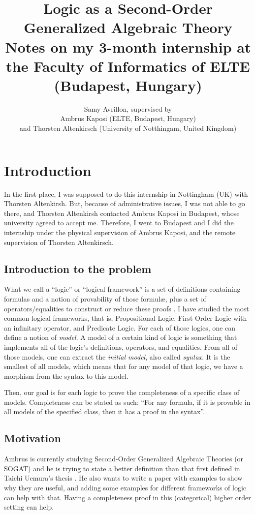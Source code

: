 \documentclass[10pt,a4paper]{article}
\title{Logic as a Second-Order Generalized Algebraic Theory
	\\[1ex] \large Notes on my 3-month internship at the Faculty of Informatics of ELTE (Budapest, Hungary)}
\author{Samy Avrillon, supervised by
	\\[1ex] Ambrus Kaposi (ELTE, Budapest, Hungary)
	\\[1ex] and Thorsten Altenkirsch (University of Notthingam, United Kingdom)}
\begin{document}
	\doparttoc
	\maketitle
	
	\hsep
	
	\tableofcontents
	
	\newpage
	
	
	\section{Introduction}
	
		In the first place, I was supposed to do this internship in Nottingham (UK) with Thorsten Altenkirsh. But, because of administrative issues, I was not able to go there, and Thorsten Altenkirsh contacted Ambrus Kaposi in Budapest, whose university agreed to accept me. Therefore, I went to Budapest and I did the internship under the physical supervision of Ambrus Kaposi, and the remote supervision of Thorsten Altenkirsch.
		
		\subsection{Introduction to the problem}
			What we call a \enquote{logic} or \enquote{logical framework} is a set of definitions containing formulas and a notion of provability of those formulæ, plus a set of operators/equalities to construct or reduce these proofs \cite{logicalFramework1993}. I have studied the most common logical frameworks, that is, Propositional Logic, First-Order Logic with an infinitary operator, and Predicate Logic. For each of those logics, one can define a notion of \emph{model}. A model of a certain kind of logic is something that implements all of the logic's definitions, operators, and equalities. From all of those models, one can extract the \emph{initial model}, also called \emph{syntax}. It is the smallest of all models, which means that for any model of that logic, we have a morphism from the syntax to this model.
			
			Then, our goal is for each logic to prove the completeness of a specific class of models. Completeness can be stated as such: \enquote{For any formula, if it is provable in all models of the specified class, then it has a proof in the syntax}.
			
		\subsection{Motivation}
			Ambrus is currently studying Second-Order Generalized Algebraic Theories (or SOGAT) and he is trying to state a better definition than that first defined in Taichi Uemura's thesis \cite{UemuraThesis2021}. He also wants to write a paper with examples to show why they are useful, and adding some examples for different frameworks of logic can help with that. Having a completeness proof in this (categorical) higher order setting \cite{hoffmann1999} can help.
			
\end{document}
